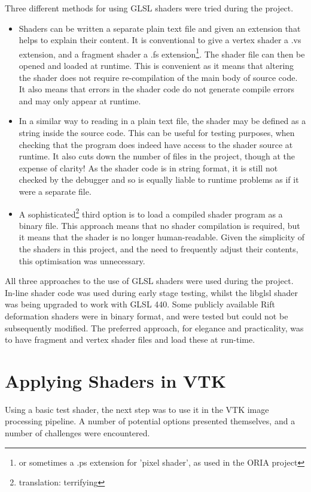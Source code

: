 \documentclass[MSc,paper=a4,pagesize=auto]{icldt}
\begin{document}
Three different methods for using GLSL shaders were tried during the project. 
\begin{itemize}
\item Shaders can be written a separate plain text file and given an extension that helps to explain their content. It is conventional to give a vertex shader a .vs extension, and a fragment shader a .fs extension\footnote{or sometimes a .ps extension for 'pixel shader', as used in the ORIA project}. The shader file can then be opened and loaded at runtime. This is convenient as it means that altering the shader does not require re-compilation of the main body of source code. It also means that errors in the shader code do not generate compile errors and may only appear at runtime. 
\item In a similar way to reading in a plain text file, the shader may be defined as a string inside the source code. This can be useful for testing purposes, when checking that the program does indeed have access to the shader source at runtime. It also cuts down the number of files in the project, though at the expense of clarity! As the shader code is in string format, it is still not checked by the debugger and so is equally liable to runtime problems as if it were a separate file.
\item A sophisticated\footnote{translation: terrifying} third option is to load a compiled shader program as a binary file. This approach means that no shader compilation is required, but it means that the shader is no longer human-readable. Given the simplicity of the shaders in this project, and the need to frequently adjust their contents, this optimisation was unnecessary.
\end{itemize}

All three approaches to the use of GLSL shaders were used during the project. In-line shader code was used during early stage testing, whilst the libglsl shader was being upgraded to work with GLSL 440. Some publicly available Rift deformation shaders were in binary format, and were tested but could not be subsequently modified. The preferred approach, for elegance and practicality, was to have fragment and vertex shader files and load these at run-time.


\section{Applying Shaders in VTK}

Using a basic test shader, the next step was to use it in the VTK image processing pipeline. A number of potential options presented themselves, and a number of challenges were encountered.
\end{document}
